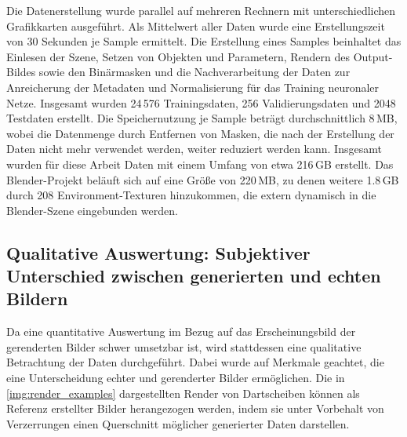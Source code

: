 Die Datenerstellung wurde parallel auf mehreren Rechnern mit unterschiedlichen Grafikkarten ausgeführt. Als Mittelwert aller Daten wurde eine Erstellungszeit von 30 Sekunden je Sample ermittelt. Die Erstellung eines Samples beinhaltet das Einlesen der Szene, Setzen von Objekten und Parametern, Rendern des Output-Bildes sowie den Binärmasken und die Nachverarbeitung der Daten zur Anreicherung der Metadaten und Normalisierung für das Training neuronaler Netze. Insgesamt wurden 24\,576 Trainingsdaten, 256 Validierungsdaten und 2048 Testdaten erstellt. Die Speichernutzung je Sample beträgt durchschnittlich 8\,MB, wobei die Datenmenge durch Entfernen von Masken, die nach der Erstellung der Daten nicht mehr verwendet werden, weiter reduziert werden kann. Insgesamt wurden für diese Arbeit Daten mit einem Umfang von etwa 216\,GB erstellt. Das Blender-Projekt beläuft sich auf eine Größe von 220\,MB, zu denen weitere 1.8\,GB durch 208 Environment-Texturen hinzukommen, die extern dynamisch in die Blender-Szene eingebunden werden.

\subsection[Qualitative Auswertung]{Qualitative Auswertung: Subjektiver Unterschied zwischen generierten und echten Bildern}  %
\label{sec:rendering_qualitativ}

Da eine quantitative Auswertung im Bezug auf das Erscheinungsbild der gerenderten Bilder schwer umsetzbar ist, wird stattdessen eine qualitative Betrachtung der Daten durchgeführt. Dabei wurde auf Merkmale geachtet, die eine Unterscheidung echter und gerenderter Bilder ermöglichen. Die in \autoref{img:render_examples} dargestellten Render von Dartscheiben können als Referenz erstellter Bilder herangezogen werden, indem sie unter Vorbehalt von Verzerrungen einen Querschnitt möglicher generierter Daten darstellen.

